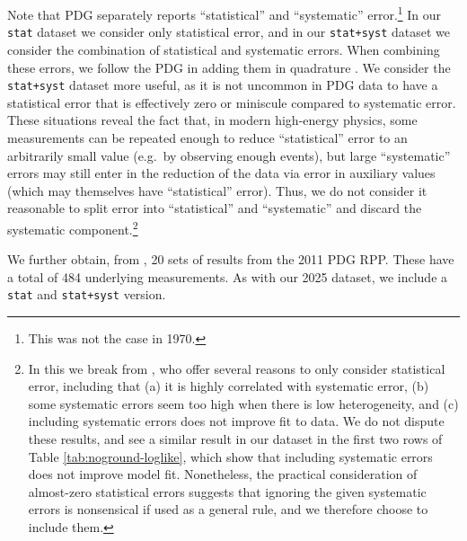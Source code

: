 \documentclass[letterpaper,12pt]{article}
\begin{document}
Note that PDG separately reports ``statistical'' and ``systematic'' error.\footnote{This was not the case in 1970.} In our \texttt{stat} dataset we consider only statistical error, and in our \texttt{stat+syst} dataset we consider the combination of statistical and systematic errors. When combining these errors, we follow the PDG in adding them in quadrature \citep[sec.~5.2.1]{navas2024review}. We consider the \texttt{stat+syst} dataset more useful, as it is not uncommon in PDG data to have a statistical error that is effectively zero or miniscule compared to systematic error. These situations reveal the fact that, in modern high-energy physics, some measurements can be repeated enough to reduce ``statistical'' error to an arbitrarily small value (e.g.~by observing enough events), but large ``systematic'' errors may still enter in the reduction of the data via error in auxiliary values (which may themselves have ``statistical'' error). Thus, we do not consider it reasonable to split error into ``statistical'' and ``systematic'' and discard the systematic component.\footnote{In this we break from \citet[sec.~3.3]{baker2013meta}, who offer several reasons to only consider statistical error, including that (a) it is highly correlated with systematic error, (b) some systematic errors seem too high when there is low heterogeneity, and (c) including systematic errors does not improve fit to data. We do not dispute these results, and see a similar result in our dataset in the first two rows of Table \ref{tab:noground-loglike}, which show that including systematic errors does not improve model fit. Nonetheless, the practical consideration of almost-zero statistical errors suggests that ignoring the given systematic errors is nonsensical if used as a general rule, and we therefore choose to include them.}

We further obtain, from \citet{baker2013meta}, 20 sets of results from the 2011 PDG RPP. These have a total of 484 underlying measurements. As with our 2025 dataset, we include a \texttt{stat} and \texttt{stat+syst} version.
\end{document}
